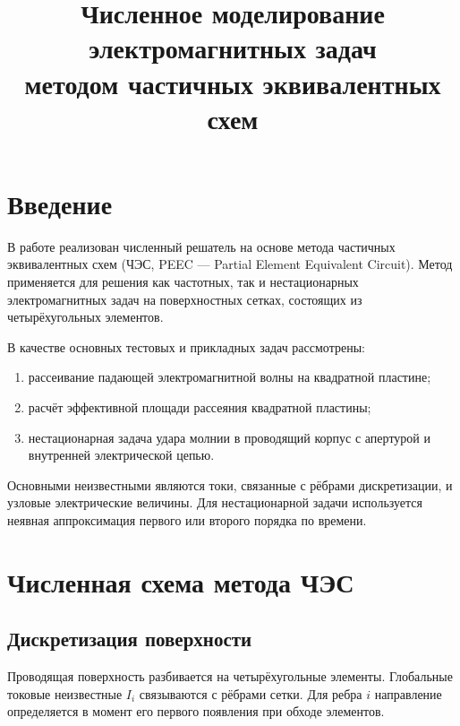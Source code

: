 \documentclass[12pt,a4paper]{article}
\title{
    Численное моделирование электромагнитных задач\\
    методом частичных эквивалентных схем
}
\author{}
\date{}
\begin{document}
\maketitle
\tableofcontents
\newpage


\section{Введение}

В работе реализован численный решатель на основе метода частичных
эквивалентных схем (ЧЭС, PEEC --- Partial Element Equivalent Circuit).
Метод применяется для решения как частотных, так и нестационарных
электромагнитных задач на поверхностных сетках, состоящих из
четырёхугольных элементов.

В качестве основных тестовых и прикладных задач рассмотрены:

\begin{enumerate}[label=\arabic*)]
    \item рассеивание падающей электромагнитной волны на квадратной пластине;
    \item расчёт эффективной площади рассеяния квадратной пластины;
    \item нестационарная задача удара молнии в проводящий корпус с апертурой
    и внутренней электрической цепью.
\end{enumerate}

Основными неизвестными являются токи, связанные с рёбрами дискретизации,
и узловые электрические величины. Для нестационарной задачи используется
неявная аппроксимация первого или второго порядка по времени.


\section{Численная схема метода ЧЭС}

\subsection{Дискретизация поверхности}

Проводящая поверхность разбивается на четырёхугольные элементы.
Глобальные токовые неизвестные $I_i$ связываются с рёбрами сетки.
Для ребра $i$ направление определяется в момент его первого появления
при обходе элементов.
\end{document}

